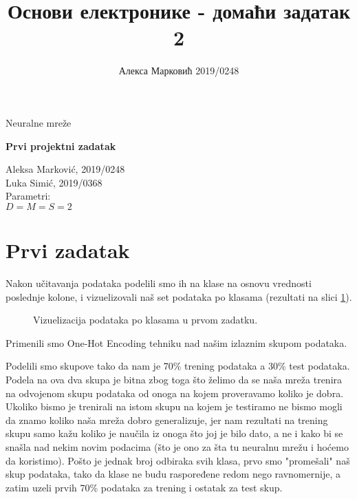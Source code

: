 \documentclass[10pt,a4paper,titlepage,croatian]{article}
\author{Алекса Марковић 2019/0248}
\title{Основи електронике - домаћи задатак 2}
\begin{document}
\lstset{language=Python,breaklines=true} 
\begin{titlepage}
\begin{center}
{\Large Neuralne mreže \par}
\begin{huge}
\sc\textbf{Prvi projektni zadatak}
\par
\end{huge}
\vspace{1cm}
\begin{large}
Aleksa Marković, 2019/0248 \\
Luka Simić, 2019/0368
\\
\vspace{1cm}
Parametri:\\
\vspace{0.5cm}
$D = M = S = 2$
\end{large}
\end{center}

\end{titlepage}

\section{Prvi zadatak}
Nakon učitavanja podataka podelili smo ih na klase na osnovu vrednosti poslednje kolone, i vizuelizovali naš set podataka po klasama (rezultati na slici \ref{Vis1Klase}).
\begin{figure}[H]
    \centering
    
    \caption{Vizuelizacija podataka po klasama u prvom zadatku.}
    \label{Vis1Klase}
\end{figure}
Primenili smo One-Hot Encoding tehniku nad našim izlaznim skupom podataka.

Podelili smo skupove tako da nam je 70\% trening podataka a 30\% test podataka. Podela na ova dva skupa je bitna zbog toga što želimo da se naša mreža trenira na odvojenom skupu podataka od onoga na kojem proveravamo koliko je dobra. Ukoliko bismo je trenirali na istom skupu na kojem je testiramo ne bismo mogli da znamo koliko naša mreža dobro generalizuje, jer nam rezultati na trening skupu samo kažu koliko je naučila iz onoga što joj je bilo dato, a ne i kako bi se snašla nad nekim novim podacima (što je ono za šta tu neuralnu mrežu i hoćemo da koristimo). Pošto je jednak broj odbiraka svih klasa, prvo smo "promešali" naš skup podataka, tako da klase ne budu raspoređene redom nego ravnomernije, a zatim uzeli prvih 70\% podataka za trening i ostatak za test skup.
\end{document}
